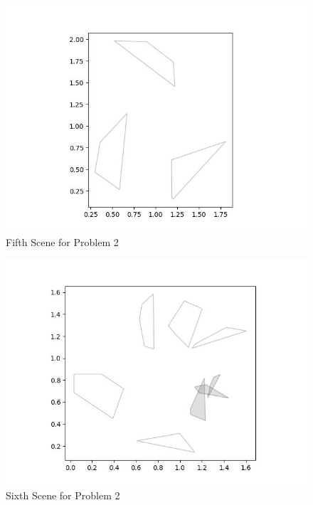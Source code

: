 \documentclass{article}
\begin{document}
\begin{figure}[h!]
	\includegraphics[width= 0.9 \linewidth]{Problem2_scene5.jpg}
	\centering
	\caption{Fifth Scene for Problem 2}
	\label{Problem2_scene5.jpg}
\end{figure}

\begin{figure}[h!]
	\includegraphics[width= 0.9 \linewidth]{Problem2_scene6.jpg}
	\centering
	\caption{Sixth Scene for Problem 2}
	\label{Problem2_scene6.jpg}
\end{figure}
\end{document}
